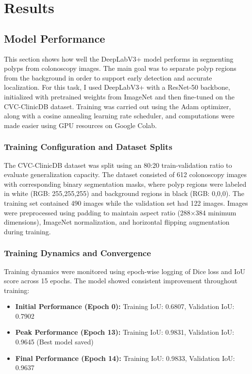 \documentclass[a4paper,12pt]{report}
\begin{document}
\chapter{Results}

\section{Model Performance}

This section shows how well the DeepLabV3+ model performs in segmenting polyps from colonoscopy images. The main goal was to separate polyp regions from the background in order to support early detection and accurate localization. For this task, I used DeepLabV3+ with a ResNet-50 backbone, initialized with pretrained weights from ImageNet and then fine-tuned on the CVC-ClinicDB dataset. Training was carried out using the Adam optimizer, along with a cosine annealing learning rate scheduler, and computations were made easier using GPU resources on Google Colab.

\subsection{Training Configuration and Dataset Splits}

The CVC-ClinicDB dataset was split using an 80:20 train-validation ratio to evaluate generalization capacity. The dataset consisted of 612 colonoscopy images with corresponding binary segmentation masks, where polyp regions were labeled in white (RGB: 255,255,255) and background regions in black (RGB: 0,0,0). The training set contained 490 images while the validation set had 122 images. Images were preprocessed using padding to maintain aspect ratio (288×384 minimum dimensions), ImageNet normalization, and horizontal flipping augmentation during training.

\subsection{Training Dynamics and Convergence}

Training dynamics were monitored using epoch-wise logging of Dice loss and IoU score across 15 epochs. The model showed consistent improvement throughout training:

\begin{itemize}
    \item \textbf{Initial Performance (Epoch 0):} Training IoU: 0.6807, Validation IoU: 0.7902
    \item \textbf{Peak Performance (Epoch 13):} Training IoU: 0.9831, Validation IoU: 0.9645 (Best model saved)
    \item \textbf{Final Performance (Epoch 14):} Training IoU: 0.9833, Validation IoU: 0.9637
\end{itemize}
\end{document}
